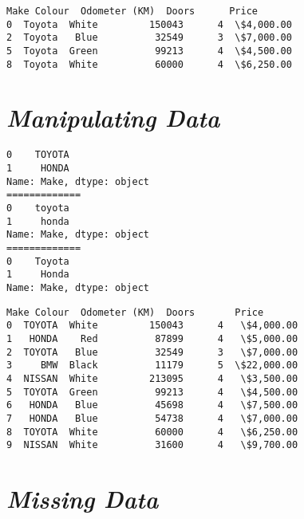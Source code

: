 \documentclass[11pt]{article}
\begin{document}
            \begin{tcolorbox}[breakable, size=fbox, boxrule=.5pt, pad at break*=1mm, opacityfill=0]
\begin{Verbatim}[commandchars=\\\{\}]
     Make Colour  Odometer (KM)  Doors      Price
0  Toyota  White         150043      4  \$4,000.00
2  Toyota   Blue          32549      3  \$7,000.00
5  Toyota  Green          99213      4  \$4,500.00
8  Toyota  White          60000      4  \$6,250.00
\end{Verbatim}
\end{tcolorbox}
        
    \hypertarget{manipulating-data}{%
\section{\texorpdfstring{\textbf{\emph{Manipulating
Data}}}{Manipulating Data}}\label{manipulating-data}}

    \begin{Verbatim}[commandchars=\\\{\}]
0    TOYOTA
1     HONDA
Name: Make, dtype: object
=============
0    toyota
1     honda
Name: Make, dtype: object
=============
0    Toyota
1     Honda
Name: Make, dtype: object
    \end{Verbatim}

            \begin{tcolorbox}[breakable, size=fbox, boxrule=.5pt, pad at break*=1mm, opacityfill=0]
\begin{Verbatim}[commandchars=\\\{\}]
     Make Colour  Odometer (KM)  Doors       Price
0  TOYOTA  White         150043      4   \$4,000.00
1   HONDA    Red          87899      4   \$5,000.00
2  TOYOTA   Blue          32549      3   \$7,000.00
3     BMW  Black          11179      5  \$22,000.00
4  NISSAN  White         213095      4   \$3,500.00
5  TOYOTA  Green          99213      4   \$4,500.00
6   HONDA   Blue          45698      4   \$7,500.00
7   HONDA   Blue          54738      4   \$7,000.00
8  TOYOTA  White          60000      4   \$6,250.00
9  NISSAN  White          31600      4   \$9,700.00
\end{Verbatim}
\end{tcolorbox}
        
    \hypertarget{missing-data}{%
\section{\texorpdfstring{\textbf{\emph{Missing
Data}}}{Missing Data}}\label{missing-data}}
\end{document}
